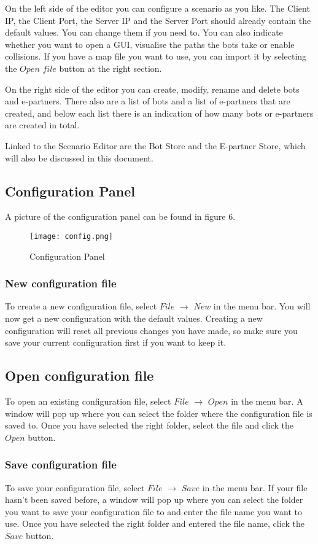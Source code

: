 \documentclass[11pt,a4paper]{article}
\begin{document}
On the left side of the editor you can configure a scenario as you like. The Client IP, the Client Port, the Server IP and the Server Port should already contain the default values. You can change them if you need to. You can also indicate whether you want to open a GUI, visualise the paths the bots take or enable collisions. If you have a map file you want to use, you can import it by selecting the $Open$ $file$ button at the right section.

On the right side of the editor you can create, modify, rename and delete bots and e-partners. There also are a list of bots and a list of e-partners that are created, and below each list there is an indication of how many bots or e-partners are created in total.

Linked to the Scenario Editor are the Bot Store and the E-partner Store, which will also be discussed in this document.
\pagebreak
\subsection{Configuration Panel}
A picture of the configuration panel can be found in figure 6.
\begin{figure}[h]
\begin{center}
\texttt{[image: config.png]}
\end{center}
\caption{Configuration Panel}
\end{figure}
\subsubsection{New configuration file}
To create a new configuration file, select $File$ $\to$ $New$ in the menu bar. You will now get a new configuration with the default values. Creating a new configuration will reset all previous changes you have made, so make sure you save your current configuration first if you want to keep it.

\subsection{Open configuration file}
To open an existing configuration file, select $File$ $\to$ $Open$ in the menu bar. A window will pop up where you can select the folder where the configuration file is saved to. Once you have selected the right folder, select the file and click the $Open$ button.

\subsubsection{Save configuration file}
To save your configuration file, select $File$ $\to$ $Save$ in the menu bar. If your file hasn't been saved before, a window will pop up where you can select the folder you want to save your configuration file to and enter the file name you want to use. Once you have selected the right folder and entered the file name, click the $Save$ button.
\end{document}

